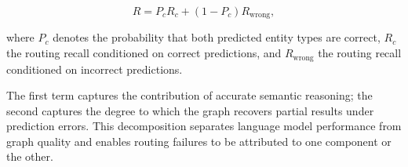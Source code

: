 \begin{equation}
    R
    =
    P_cR_c
    +
    (1-P_c)R_{\text{wrong}},
    \label{eq:recall-decomposition}
\end{equation}

where $P_c$ denotes the probability that both predicted entity types are correct,
$R_c$ the routing recall conditioned on correct predictions,
and $R_{\text{wrong}}$ the routing recall conditioned on incorrect predictions.

The first term captures the contribution of accurate semantic reasoning; the second captures the degree to which the graph recovers partial results under prediction errors.
This decomposition separates language model performance from graph quality and enables routing failures to be attributed to one component or the other.